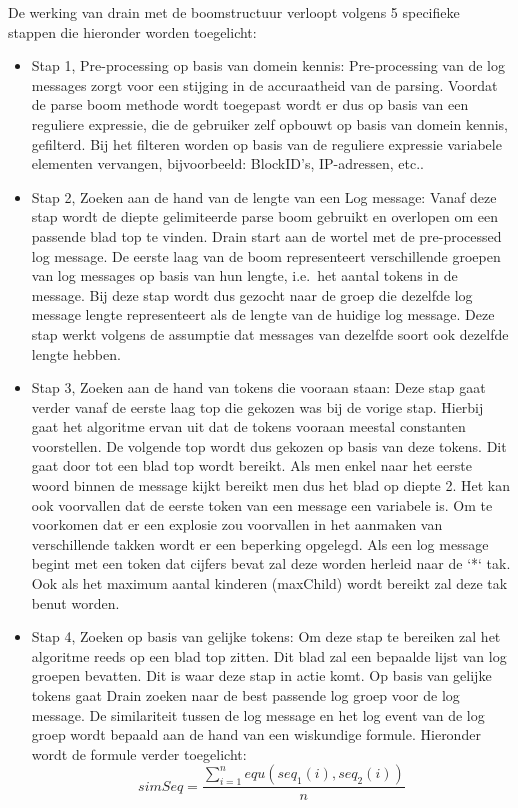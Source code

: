 De werking van drain met de boomstructuur verloopt volgens 5 specifieke stappen die hieronder worden toegelicht:
\begin{itemize}
    \item Stap 1, Pre-processing op basis van domein kennis: Pre-processing van de log messages zorgt voor een stijging in de accuraatheid van de parsing. Voordat de parse boom methode wordt toegepast wordt er dus op basis van een reguliere expressie, die de gebruiker zelf opbouwt op basis van domein kennis, gefilterd. Bij het filteren worden op basis van de reguliere expressie variabele elementen vervangen, bijvoorbeeld: BlockID's, IP-adressen, etc.. \\
    
    \item Stap 2, Zoeken aan de hand van de lengte van een Log message:
    Vanaf deze stap wordt de diepte gelimiteerde parse boom gebruikt en overlopen om een passende blad top te vinden. Drain start aan de wortel met de pre-processed log message. De eerste laag van de boom representeert verschillende groepen van log messages op basis van hun lengte, i.e.\ het aantal tokens in de message. Bij deze stap wordt dus gezocht naar de groep die dezelfde log message lengte representeert als de lengte van de huidige log message. Deze stap werkt volgens de assumptie dat messages van dezelfde soort ook dezelfde lengte hebben. \\
    
    \item Stap 3, Zoeken aan de hand van tokens die vooraan staan: 
    Deze stap gaat verder vanaf de eerste laag top die gekozen was bij de vorige stap. Hierbij gaat het algoritme ervan uit dat de tokens vooraan meestal constanten voorstellen. De volgende top wordt dus gekozen op basis van deze tokens. Dit gaat door tot een blad top wordt bereikt. Als men enkel naar het eerste woord binnen de message kijkt bereikt men dus het blad op diepte 2. Het kan ook voorvallen dat de eerste token van een message een variabele is. Om
    te voorkomen dat er een explosie zou voorvallen in het aanmaken van verschillende takken wordt er een beperking opgelegd. Als een log message begint met een token dat cijfers bevat zal deze worden herleid naar de `*` tak. Ook als het maximum aantal kinderen (maxChild) wordt bereikt zal deze tak benut worden. \\
    \item Stap 4, Zoeken op basis van gelijke tokens:
    Om deze stap te bereiken zal het algoritme reeds op een blad top zitten. Dit blad zal een bepaalde lijst van log groepen bevatten. Dit is waar deze stap in actie komt. Op basis van gelijke tokens gaat Drain zoeken naar de best passende log groep voor de log message. De similariteit tussen de log message en het log event van de log groep wordt bepaald aan de hand van een wiskundige formule. Hieronder wordt de formule verder toegelicht:\\
    \[ simSeq = \frac{\sum_{i=1}^{n}equ(seq_{1}(i), seq_{2}(i))}{n} \]


\end{itemize}
